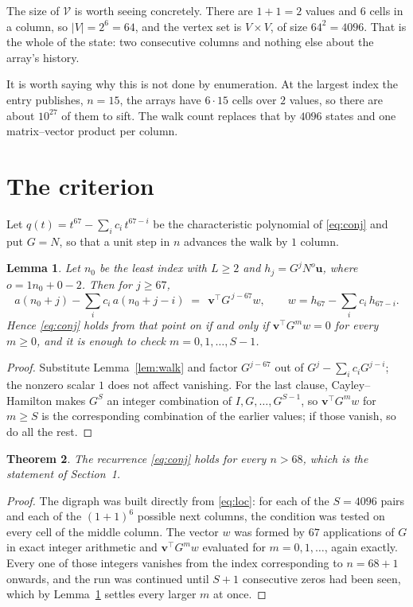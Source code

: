 \documentclass[11pt,a4paper]{article}
\theoremstyle{plain}
\newtheorem{theorem}{Theorem}
\newtheorem{lemma}[theorem]{Lemma}
\theoremstyle{definition}
\begin{document}
The size of $\mathcal V$ is worth seeing concretely. There are $1+1=2$ values
and $6$ cells in a column, so $|V|=2^{6}=64$, and the vertex set is
$V\times V$, of size $64^2=4096$. That is the whole of the state: two consecutive
columns and nothing else about the array's history.

It is worth saying why this is not done by enumeration. At the largest index the entry
publishes, $n=15$, the arrays have $6\cdot15$ cells over
$2$ values, so there are about $10^{27}$ of them to sift. The
walk count replaces that by $4096$ states and one matrix--vector product per column.
\section{The criterion}

Let $q(t)=t^{67}-\sum_i c_i\,t^{67-i}$ be the characteristic polynomial of
\eqref{eq:conj} and put $G=N$, so that a unit step in $n$ advances the walk by
$1$ column.

\begin{lemma}\label{lem:crit}
Let $n_0$ be the least index with $L\ge2$ and $h_j=G^{j}N^{o}\mathbf{u}$, where
$o=1n_0+0-2$. Then for $j\ge67$,
\[
a(n_0+j)-\sum_i c_i\,a(n_0+j-i)\;=\;\,\mathbf{v}^{\!\top}G^{\,j-67}w,
\qquad w=h_{67}-\sum_i c_i\,h_{67-i} .
\]
Hence \eqref{eq:conj} holds from that point on if and only if
$\mathbf{v}^{\!\top}G^{m}w=0$ for every $m\ge0$, and it is enough to check
$m=0,1,\dots,S-1$.
\end{lemma}

\begin{proof}
Substitute Lemma~\ref{lem:walk} and factor $G^{j-67}$ out of
$G^{j}-\sum_ic_iG^{j-i}$; the nonzero scalar $1$ does not affect
vanishing. For the last clause, Cayley--Hamilton makes $G^{S}$ an integer combination of
$I,G,\dots,G^{S-1}$, so $\mathbf{v}^{\!\top}G^{m}w$ for $m\ge S$ is the corresponding
combination of the earlier values; if those vanish, so do all the rest.
\end{proof}

\begin{theorem}
The recurrence \eqref{eq:conj} holds for every $n>68$, which is the statement of
Section~1.
\end{theorem}

\begin{proof}
The digraph was built directly from \eqref{eq:loc}: for each of the $S=4096$ pairs and each
of the $(1+1)^{6}$ possible next columns, the condition was tested on every cell of
the middle column. The vector $w$ was formed by $67$ applications of $G$ in exact integer
arithmetic and $\mathbf{v}^{\!\top}G^{m}w$ evaluated for $m=0,1,\dots$, again exactly.
Every one of those integers vanishes from the index corresponding to $n=68+1$ onwards,
and the run was continued until $S+1$ consecutive zeros had been seen, which by
Lemma~\ref{lem:crit} settles every larger $m$ at once.
\end{proof}
\end{document}
